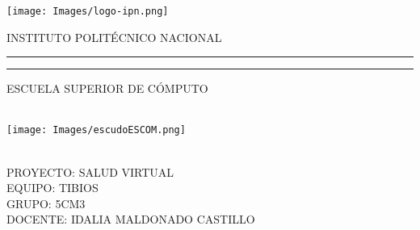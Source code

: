 \documentclass[letterpaper,12pt,oneside]{article}
\begin{document}
\justifying
    \begin{titlepage}
        \thispagestyle{empty}
        \begin{minipage}[c][0.17\textheight][c]{0.25\textwidth}
            \begin{center}
            \hspace*{-13mm}
            \texttt{[image: Images/logo-ipn.png]}
            \end{center}
        \end{minipage}
        \begin{minipage}[c][0.195\textheight][t]{0.75\textwidth}
            \begin{center}
                \vspace{0.3cm}
                {\color{black}\textsc{\large INSTITUTO POLITÉCNICO NACIONAL} }\\[0.5cm]
                \vspace{0.3cm}
                {\color{black}\hrule height3pt}
                \vspace{.2cm}
                {\color{black}\hrule height2pt}
                \vspace{.8cm}
                \textsc{\large ESCUELA SUPERIOR DE CÓMPUTO}\\[0cm] %
            \end{center}
        \end{minipage}
    \begin{minipage}[c][0.81\textheight][t]{0.25\textwidth}
        \vspace*{5mm}
        \begin{center}
            \hskip0.5mm
            \vspace{5mm}
            \hskip2pt
            {\color{black}\vrule width3pt height13cm}
            \hskip2mm
            {\color{black}\vrule width1pt height13cm} \\
            \vspace{5mm}
            \hspace*{2mm}
            \texttt{[image: Images/escudoESCOM.png]}
        \end{center}
    \end{minipage}
    \begin{minipage}[c][0.81\textheight][t]{0.75\textwidth}
        \begin{center}
            \vspace{0.5cm}
            {\color{black}{\large \scshape ANÁLISIS Y DISEÑO DE SISTEMAS}}\\[.2in]
            \vspace{2cm}            
            \textsc{\large {PROYECTO: SALUD VIRTUAL}}\\[2cm]
            {\large \scshape 
                {\color{black}EQUIPO: TIBIOS}\\[2cm] 
                {GRUPO: 5CM3}\\[2cm]
                {DOCENTE: IDALIA MALDONADO CASTILLO}}
                \vspace{0.5cm}
        \end{center}
    \end{minipage}
    \end{titlepage}
    \tableofcontents
    \newpage
\end{document}
